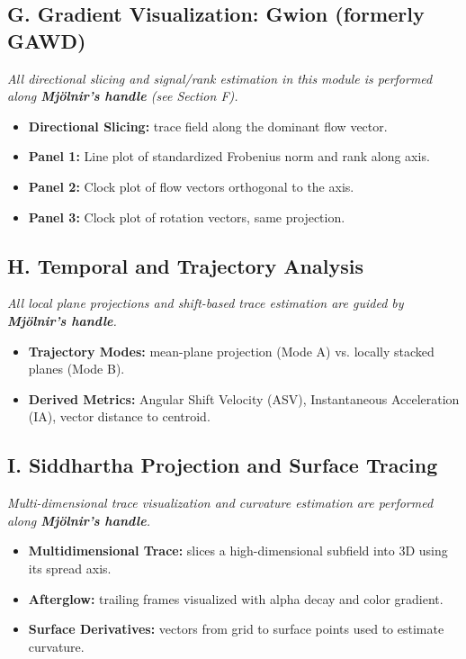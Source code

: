 \documentclass{article}
\begin{document}
\subsection*{G. Gradient Visualization: Gwion (formerly GAWD)}
\textit{All directional slicing and signal/rank estimation in this module is performed along \textbf{Mjölnir’s handle} (see Section F).}
\begin{itemize}[leftmargin=1.5em]
  \item \textbf{Directional Slicing:} trace field along the dominant flow vector.
  \item \textbf{Panel 1:} Line plot of standardized Frobenius norm and rank along axis.
  \item \textbf{Panel 2:} Clock plot of flow vectors orthogonal to the axis.
  \item \textbf{Panel 3:} Clock plot of rotation vectors, same projection.
\end{itemize}

\subsection*{H. Temporal and Trajectory Analysis}
\textit{All local plane projections and shift-based trace estimation are guided by \textbf{Mjölnir’s handle}.}
\begin{itemize}[leftmargin=1.5em]
  \item \textbf{Trajectory Modes:} mean-plane projection (Mode A) vs. locally stacked planes (Mode B).
  \item \textbf{Derived Metrics:} Angular Shift Velocity (ASV), Instantaneous Acceleration (IA), vector distance to centroid.
\end{itemize}

\subsection*{I. Siddhartha Projection and Surface Tracing}
\textit{Multi-dimensional trace visualization and curvature estimation are performed along \textbf{Mjölnir’s handle}.}
\begin{itemize}[leftmargin=1.5em]
  \item \textbf{Multidimensional Trace:} slices a high-dimensional subfield into 3D using its spread axis.
  \item \textbf{Afterglow:} trailing frames visualized with alpha decay and color gradient.
  \item \textbf{Surface Derivatives:} vectors from grid to surface points used to estimate curvature.
\end{itemize}
\end{document}
